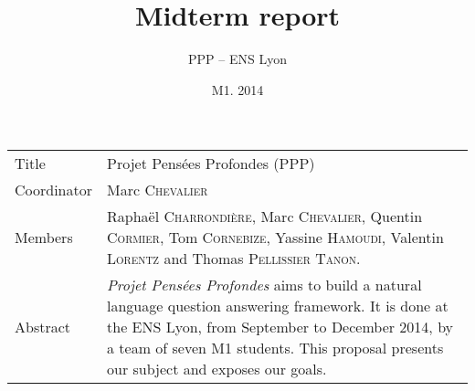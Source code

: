 \documentclass[a4paper,10pt]{article}
\title{Midterm report}
\author{PPP \--- ENS Lyon}
\date{M1. 2014}
\begin{document}
\maketitle

\newlength{\title}
\settowidth{\title}{Coordinator }

\newlength{\object}
\setlength{\object}{\textwidth} \addtolength{\object}{-\title} \addtolength{\object}{-6.8pt} 
    \addtolength{\object}{-2\tabcolsep}

\renewcommand{\arraystretch}{1.5}

\begin{center}
\begin{tabular}{@{}|p{\title}p{\object}@{}|}
\hline
Title & Projet Pensées Profondes (PPP)\\
Coordinator & Marc \textsc{Chevalier}\\
Members & Raphaël \textsc{Charrondière}, Marc \textsc{Chevalier}, Quentin 
      \textsc{Cormier}, Tom \textsc{Cornebize}, \linebreak Yassine \textsc{Hamoudi}, 
      Valentin \textsc{Lorentz} and Thomas \textsc{Pellissier} \textsc{Tanon}.\\
Abstract & \emph{Projet Pensées Profondes} aims to build a natural language question answering framework.
It is done at the ENS Lyon, from September to December 2014, by a team of seven M1 students. This proposal presents
our subject and exposes our goals.\\
\hline
\end{tabular}
\end{center}
\tableofcontents
















\end{document}
